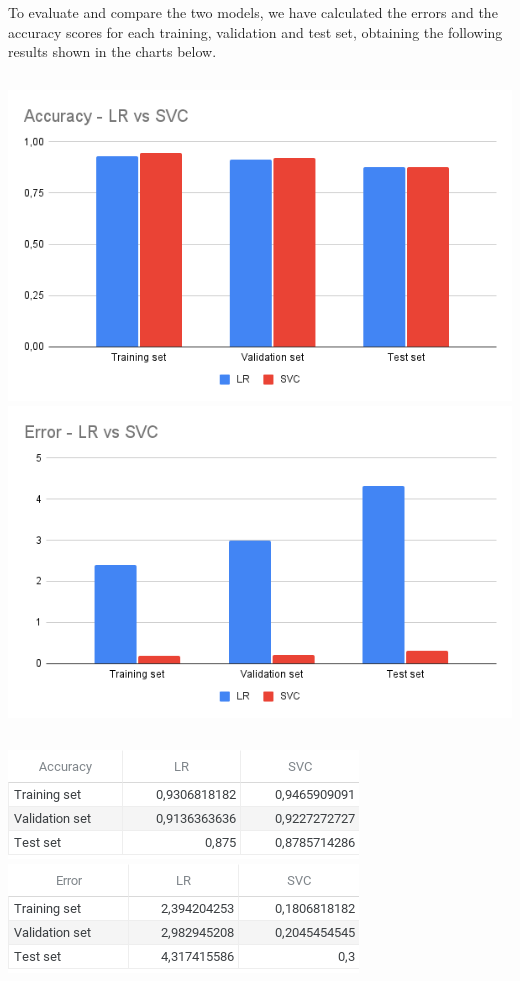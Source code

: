 \documentclass[a4paper,12pt]{article}
\begin{document}
To evaluate and compare the two models, we have calculated the errors and the accuracy scores for each training, validation and test set, obtaining the following results shown in the charts below.
\begin{center}
\begin{tabular}{l}
\\
\end{tabular}
\end{center}
\includegraphics[height=0.3\textwidth]{./graphs/accuracy_chart.png}
\includegraphics[height=0.3\textwidth]{./graphs/error_chart.png}
\begin{center}
\begin{tabular}{l}
\\
\end{tabular}
\end{center}
\includegraphics[height=0.15\textwidth]{./graphs/accuracy_table.png}
\includegraphics[height=0.15\textwidth]{./graphs/error_table.png}

\begin{center}
\begin{tabular}{l}
\\
\end{tabular}
\end{center}
\end{document}
